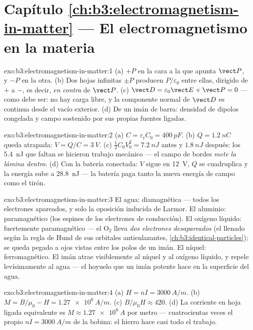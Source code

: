 \section*{Capítulo \ref{ch:b3:electromagnetism-in-matter} --- El electromagnetismo en la materia}

\begin{solution}{exo:b3:electromagnetism-in-matter:1}
(a) $+P$ en la cara a la que apunta $\vect P$, y $-P$ en la otra. (b)
Dos hojas infinitas $\pm P$ producen $P/\varepsilon_0$ entre ellas,
dirigido de $+$ a $-$, es decir, \emph{en contra} de $\vect P$. (c)
$\vect D = \varepsilon_0\vect E + \vect P = 0$ --- como debe ser:
no hay carga libre, y la componente normal de $\vect D$ es continua desde
el vacío exterior. (d) De un imán de barra: densidad de dipolos congelada y
campo sostenido por sus propias fuentes ligadas.
\end{solution}

\begin{solution}{exo:b3:electromagnetism-in-matter:2}
(a) $C = \varepsilon_{\text{r}}C_0 = \qty{400}{pF}$. (b) $Q =
\qty{1.2}{nC}$ queda atrapada: $V = Q/C = \qty{3}{V}$. (c)
$\tfrac12C_0V_0^2 = \qty{7.2}{nJ}$ antes y $\qty{1.8}{nJ}$ después:
los \qty{5.4}{nJ} que faltan se hicieron trabajo mecánico --- el campo de
bordes \emph{mete la lámina dentro}. (d) Con la batería conectada: $V$ sigue en
\qty{12}{V}, $Q$ se cuadruplica y la energía sube a \qty{28.8}{nJ} ---
la batería paga tanto la nueva energía de campo como el tirón.
\end{solution}

\begin{solution}{exo:b3:electromagnetism-in-matter:3}
El agua: diamagnética --- todos los electrones apareados, y solo la oposición
inducida de Larmor. El aluminio: paramagnético (los espines de los electrones de conducción).
El oxígeno líquido: fuertemente paramagnético --- el O$_2$ lleva \emph{dos
electrones desapareados} (el llenado según la regla de Hund de sus orbitales
antienlazantes, \cref{ch:b3:identical-particles}); se queda pegado a ojos vistas
entre los polos de un imán. El níquel: ferromagnético. El imán atrae
visiblemente al níquel y al oxígeno líquido, y repele levísimamente al
agua --- el hoyuelo que un imán potente hace en la superficie del agua.
\end{solution}

\begin{solution}{exo:b3:electromagnetism-in-matter:4}
(a) $H = nI = \qty{3000}{A/m}$. (b) $M = B/\mu_0 - H =
\qty{1.27e6}{A/m}$. (c) $B/\mu_0H \approx 420$. (d) La
corriente en hoja ligada equivalente es $M \approx \qty{1.27e6}{A}$ por
metro --- cuatrocientas veces el propio $nI = \qty{3000}{A/m}$ de la bobina:
el hierro hace casi todo el trabajo.
\end{solution}


